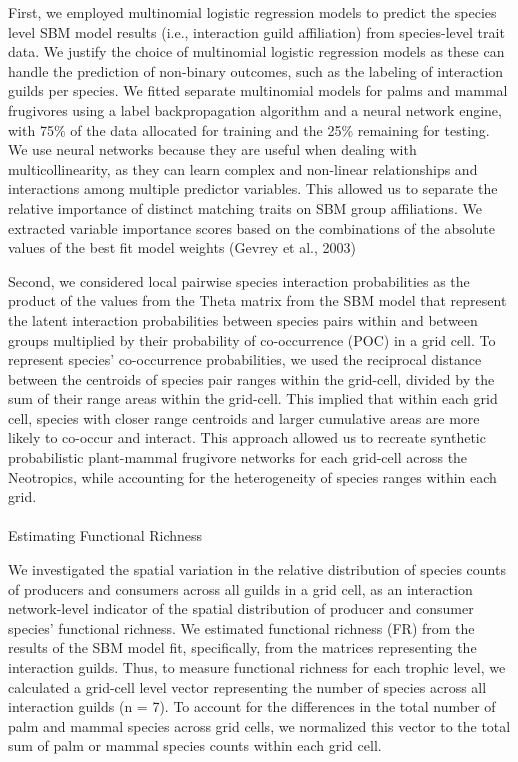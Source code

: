 \documentclass[
]{agujournal2019}
\makeatletter
\let\oldparagraph\paragraph
\renewcommand{\paragraph}{
    \@ifstar
      \xxxParagraphStar
      \xxxParagraphNoStar
  }
\newcommand{\xxxParagraphStar}[1]{\oldparagraph*{#1}\mbox{}}
\newcommand{\xxxParagraphNoStar}[1]{\oldparagraph{#1}\mbox{}}
\makeatother
\begin{document}
First, we employed multinomial logistic regression models to predict the
species level SBM model results (i.e., interaction guild affiliation)
from species-level trait data. We justify the choice of multinomial
logistic regression models as these can handle the prediction of
non-binary outcomes, such as the labeling of interaction guilds per
species. We fitted separate multinomial models for palms and mammal
frugivores using a label backpropagation algorithm and a neural network
engine, with 75\% of the data allocated for training and the 25\%
remaining for testing. We use neural networks because they are useful
when dealing with multicollinearity, as they can learn complex and
non-linear relationships and interactions among multiple predictor
variables. This allowed us to separate the relative importance of
distinct matching traits on SBM group affiliations. We extracted
variable importance scores based on the combinations of the absolute
values of the best fit model weights (Gevrey et al., 2003)

Second, we considered local pairwise species interaction probabilities
as the product of the values from the Theta matrix from the SBM model
that represent the latent interaction probabilities between species
pairs within and between groups multiplied by their probability of
co-occurrence (POC) in a grid cell. To represent species' co-occurrence
probabilities, we used the reciprocal distance between the centroids of
species pair ranges within the grid-cell, divided by the sum of their
range areas within the grid-cell. This implied that within each grid
cell, species with closer range centroids and larger cumulative areas
are more likely to co-occur and interact. This approach allowed us to
recreate synthetic probabilistic plant-mammal frugivore networks for
each grid-cell across the Neotropics, while accounting for the
heterogeneity of species ranges within each grid.

\paragraph{Estimating Functional
Richness}\label{estimating-functional-richness}

We investigated the spatial variation in the relative distribution of
species counts of producers and consumers across all guilds in a grid
cell, as an interaction network-level indicator of the spatial
distribution of producer and consumer species' functional richness. We
estimated functional richness (FR) from the results of the SBM model
fit, specifically, from the matrices representing the interaction
guilds. Thus, to measure functional richness for each trophic level, we
calculated a grid-cell level vector representing the number of species
across all interaction guilds (n = 7). To account for the differences in
the total number of palm and mammal species across grid cells, we
normalized this vector to the total sum of palm or mammal species counts
within each grid cell.
\end{document}
